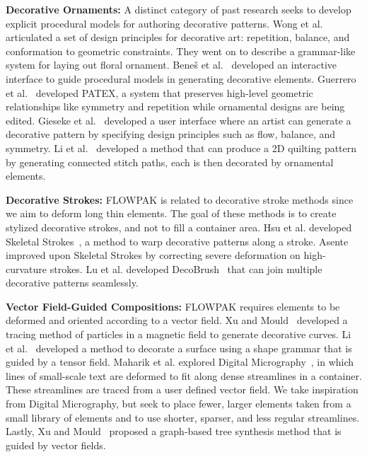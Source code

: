
\newtext
{
\textbf{Decorative Ornaments:} A distinct category of past research seeks to develop explicit procedural
models for authoring decorative patterns.  Wong et al.~\cite{Wong1998}
articulated a set of design principles for decorative art:
repetition, balance, and conformation to geometric constraints.  They
went on to describe a grammar-like system for laying out floral ornament.
Bene\v{s} et al.~\cite{Benes2011} developed an interactive 
interface to guide procedural models in generating decorative elements.
Guerrero et al.~\cite{Guerrero2016} developed PATEX, a system that preserves high-level geometric relationships
like symmetry and repetition while ornamental designs are being edited.
Gieseke et al.~\cite{Gieseke2017} developed a user interface where an artist 
can generate a decorative pattern by specifying design principles such as flow, balance, and symmetry.
Li et al.~\cite{Li2019} developed a method that can produce a 2D quilting pattern
by generating connected stitch paths, 
each is then decorated by ornamental elements.
}

\newtext
{
\textbf{Decorative Strokes:}
FLOWPAK is related to decorative stroke methods since we aim to deform long thin elements. 
The goal of these methods is to create stylized decorative strokes, and not to fill a container area. 
Hsu et al. developed Skeletal Strokes~\cite{Hsu1993}, a method to warp decorative patterns along a stroke.
Asente~\cite{Asente2010} improved upon Skeletal Strokes by correcting severe deformation on high-curvature strokes.
Lu et al. developed DecoBrush~\cite{Lu2014} that can join multiple decorative patterns seamlessly.
}

\newtext
{
\textbf{Vector Field-Guided Compositions:} 
FLOWPAK requires elements to be deformed and oriented according to a vector field.
Xu and Mould~\cite{Xu2009} developed a tracing method of particles in a magnetic field to
generate decorative curves.
Li et al.~\cite{Li2010} developed a method to decorate a surface using a shape grammar that is guided by a tensor field.
Maharik et al. explored Digital Micrography~\cite{Maharik2011}, in which
lines of small-scale text are deformed to fit along dense streamlines in a container.
These streamlines are traced from a user defined vector field.
We take inspiration from Digital Micrography, but seek to place fewer,
larger elements taken from a small library of elements and to use shorter, sparser, and less regular streamlines. 
Lastly, Xu and Mould~\cite{Xu2015} proposed a graph-based tree synthesis method that is guided by vector fields.
}

